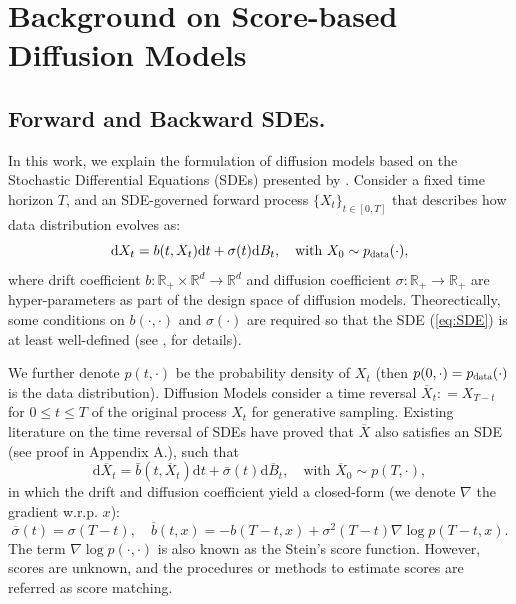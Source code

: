 \documentclass[letterpaper,10pt,reqno]{amsart}
\def\eqref#1{(\ref{#1})}
\numberwithin{equation}{section}
\begin{document}
\section{Background on Score-based Diffusion Models}
\label{sc2}

\subsection{Forward and Backward SDEs.}
\label{sc21}
In this work, we explain the formulation of diffusion models based on the Stochastic Differential Equations (SDEs) presented by \cite{Song20}. 
Consider a fixed time horizon $T$, and an SDE-governed forward process $\{X_t\}_{t\in [0,T]}$ that describes how data distribution evolves as: 
\begin{equation}
\label{eq:SDE}
\mathrm{d} X_t = b(t, X_t) \mathrm{d}t + \sigma(t) \mathrm{d}B_t, \quad \mbox{with } X_0 \sim p_{\scalebox{0.7}{data}}(\cdot),
\end{equation}
where drift coefficient
$b: \mathbb{R}_+ \times \mathbb{R}^d \to \mathbb{R}^d$ and 
diffusion coefficient $\sigma: \mathbb{R}_+  \to \mathbb{R}_+$
are hyper-parameters as part of the design space of diffusion models.
Theorectically, some conditions on $b(\cdot, \cdot)$ and $\sigma(\cdot)$ are required
so that the SDE \eqref{eq:SDE} is at least well-defined (see \cite[Chapter 5]{KS91}, \cite[Section 3.1]{TZ23} for details).

We further denote $p(t, \cdot)$ be the probability density of $X_t$ (then $p(0,\cdot)=p_{\scalebox{0.7}{data}}(\cdot)$ is the data distribution).
Diffusion Models consider a time reversal $\overline{X}_t: = X_{T-t}$ for $0 \le t \le T$ of the original process $X_t$ for generative sampling. Existing literature on the time reversal of SDEs \cite{Ander82, HP86} have proved that $\overline{X}$ also satisfies an SDE (see proof in
Appendix A.), such that 
\begin{equation}
\label{eqn:SDE_reversal}
\mathrm{d}\overline{X}_t = \bar{b}(t, \overline{X}_t) \mathrm{d}t + \bar{\sigma}(t) \mathrm{d}\overline{B}_t, \quad \mbox{with } \overline{X}_0 \sim p(T, \cdot),
\end{equation}
in which the drift and diffusion coefficient yield a closed-form (we denote $\nabla$ the gradient w.r.p. $x$):
\begin{equation}
\label{eqn:SDE_reversal_coef}
\overline{\sigma}(t) = \sigma(T-t), \quad
\overline{b}(t,x) = -b(T-t, x) + \sigma^2(T-t)  \nabla \log p (T-t,x).
\end{equation}
The term $\nabla \log p(\cdot, \cdot)$ is also known as the Stein's score function. However, scores are unknown, and the procedures or methods to estimate scores are referred as score matching.
\end{document}
